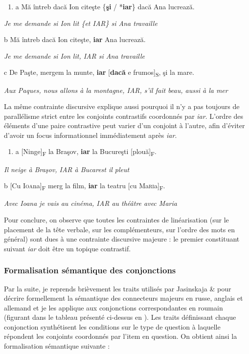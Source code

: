 \begin{enumerate}
\item \label{bkm:Ref301986761}a  Mă întreb dacă Ion citeşte \{\textbf{şi} / *\textbf{iar}\} dacă Ana lucrează.


\end{enumerate}
{\itshape
Je me demande si Ion lit \{et {\textbar} IAR\} si Ana travaille}

  b  Mă întreb dacă Ion citeşte, \textbf{iar} Ana lucrează.

{\itshape
Je me demande si Ion lit, IAR si Ana travaille}

  c  De Paşte, mergem la munte, \textbf{iar} [\textbf{dacă} e frumos]\textsubscript{S}, şi la mare.

{\itshape
Aux Paques, nous allons à la montagne, IAR, s'il fait beau, aussi à la mer} 

La même contrainte discursive explique aussi pourquoi il n'y a pas toujours de parallélisme strict entre les conjoints contrastifs coordonnés par \textit{iar}. L'ordre des éléments d'une paire contrastive peut varier d'un conjoint à l'autre, afin d'éviter d'avoir un focus informationnel immédiatement après \textit{iar}.  


\begin{enumerate}
\item a  [Ninge]\textsubscript{F} la Braşov, \textbf{iar} la Bucureşti [plouă]\textsubscript{F}.


\end{enumerate}
{\itshape
Il neige à Braşov, IAR à Bucarest il pleut}

  b  [Cu I\textsc{oa}na]\textsubscript{F} merg la film, \textbf{iar} la teatru [cu Ma\textsc{ri}a]\textsubscript{F}.

{\itshape
Avec Ioana je vais au cinéma, IAR au théâtre avec Maria} 

Pour conclure, on observe que toutes les contraintes de linéarisation (sur le placement de la tête verbale, sur les complémenteurs, sur l'ordre des mots en général) sont dues à une contrainte discursive majeure : le premier constituant suivant \textit{iar} doit être un topique contrastif.

\subsubsection{Formalisation sémantique des conjonctions}
Par la suite, je reprends brièvement les traits utilisés par Jasinskaja \& \citet{Zeevat2009} pour décrire formellement la sémantique des connecteurs majeurs en russe, anglais et allemand et je les applique aux conjonctions correspondantes en roumain (figurant dans le tableau présenté ci-dessus en ). Les traits définissant chaque conjonction synthétisent les conditions sur le type de question à laquelle répondent les conjoints coordonnés par l'item en question. On obtient ainsi la formalisation sémantique suivante : 


